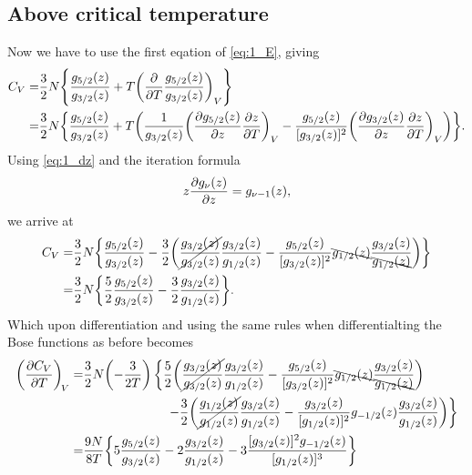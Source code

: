 \documentclass[11pt,letter, swedish, english
]{article}
\begin{document}
\subsection{Above critical temperature}
Now we have to use the first eqation of \eqref{eq:1_E}, giving
\begin{equation}
\begin{aligned}
C_V=&\frac{3}{2}N\qty{\frac{g_{5/2}(z)}{g_{3/2}(z)}
+T\qty(\pdv{T}\frac{g_{5/2}(z)}{g_{3/2}(z)})_V}\\
=&\frac{3}{2}N\qty{\frac{g_{5/2}(z)}{g_{3/2}(z)}
+T\qty(\frac{1}{g_{3/2}(z)}\qty(\pdv{g_{5/2}(z)}{z}\pdv{z}{T})_V
-\frac{g_{5/2}(z)}{[g_{3/2}(z)]^2}\qty(\pdv{g_{3/2}(z)}{z}\pdv{z}{T})_V )
}.
\end{aligned}
\end{equation}
Using \eqref{eq:1_dz} and the iteration formula
\begin{equation}
z\pdv{g_\nu(z)}{z}=g_{\nu-1}(z),
\end{equation}
we arrive at
\begin{equation}
\begin{aligned}
C_V=&\frac{3}{2}N\qty{\frac{g_{5/2}(z)}{g_{3/2}(z)}
-\frac{3}{2}\qty(\cancel{\frac{g_{3/2}(z)}{g_{3/2}(z)}}\frac{g_{3/2}(z)}{g_{1/2}(z)}
-\frac{g_{5/2}(z)}{[g_{3/2}(z)]^2} \bcancel{g_{1/2}(z)} 
\frac{g_{3/2}(z)}{\bcancel{g_{1/2}(z)}}
)}\\
=&\frac{3}{2}N\qty{\frac{5}{2}\frac{g_{5/2}(z)}{g_{3/2}(z)}
-\frac{3}{2}\frac{g_{3/2}(z)}{g_{1/2}(z)}
}.
\end{aligned}
\end{equation}
Which upon differentiation and using the same rules when
differentialting the Bose functions as before becomes
\begin{equation}
\begin{aligned}
\qty(\pdv{C_V}{T})_{\!V}
=&\frac{3}{2}N\qty(-\frac{3}{2T})\left\{
\frac{5}{2}\qty(\cancel{\frac{g_{3/2}(z)}{g_{3/2}(z)}}\frac{g_{3/2}(z)}{g_{1/2}(z)}
-\frac{g_{5/2}(z)}{[g_{3/2}(z)]^2} \bcancel{g_{1/2}(z)} 
\frac{g_{3/2}(z)}{\bcancel{g_{1/2}(z)}}
)\right.\\
&\hspace{65pt}\left.
-\frac{3}{2}\qty(\cancel{\frac{g_{1/2}(z)}{g_{1/2}(z)}}\frac{g_{3/2}(z)}{g_{1/2}(z)}
-\frac{g_{3/2}(z)}{[g_{1/2}(z)]^2} g_{-1/2}(z)
\frac{g_{3/2}(z)}{g_{1/2}(z)}
)\right\}\\
=&\frac{9N}{8T}\qty{
5\frac{g_{5/2}(z)}{g_{3/2}(z)}
-2\frac{g_{3/2}(z)}{g_{1/2}(z)}
-3\frac{[g_{3/2}(z)]^2 g_{-1/2}(z)}{[g_{1/2}(z)]^3}
}
\end{aligned}
\end{equation}
\end{document}
